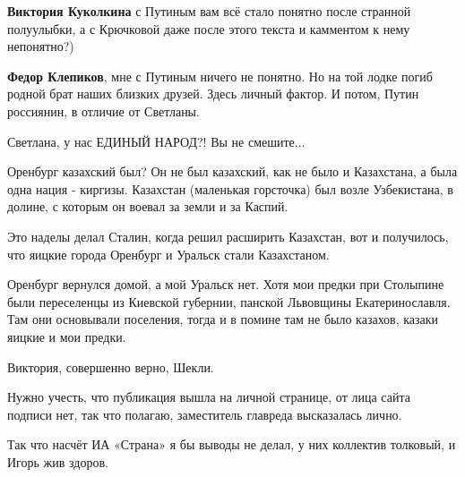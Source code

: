 \begin{itemize}
\begin{itemize}
\textbf{Виктория Куколкина} с Путиным вам всё стало понятно после странной полуулыбки, а с Крючковой даже после этого текста и камментом к нему непонятно?)

 
\textbf{Федор Клепиков}, мне с Путиным ничего не понятно. Но на той лодке погиб родной брат наших близких друзей. Здесь личный фактор. И потом, Путин россиянин, в отличие от Светланы.

 

Светлана, у нас ЕДИНЫЙ НАРОД?! Вы не смешите...

Оренбург казахский был? \Smiley[1.0][yellow]Он не был казахский, как не было и Казахстана, а была
одна нация - киргизы. Казахстан (маленькая горсточка) был возле Узбекистана, в
долине, с которым он воевал за земли и за Каспий. 

Это наделы делал Сталин, когда решил расширить Казахстан, вот и получилось, что
яицкие города Оренбург и Уральск стали Казахстаном. 

Оренбург вернулся домой, а мой Уральск нет. Хотя мои предки при Столыпине были
переселенцы из Киевской губернии, панской Львовщины Екатеринославля. Там они
основывали поселения, тогда и в помине там не было казахов, казаки яицкие и мои
предки.

 

Виктория, совершенно верно, Шекли.

Нужно учесть, что публикация вышла на личной странице, от лица сайта подписи
нет, так что полагаю, заместитель главреда высказалась лично.

Так что насчёт ИА «Страна» я бы выводы не делал, у них коллектив толковый, и
Игорь жив здоров.


 


\end{itemize}
\end{itemize}
